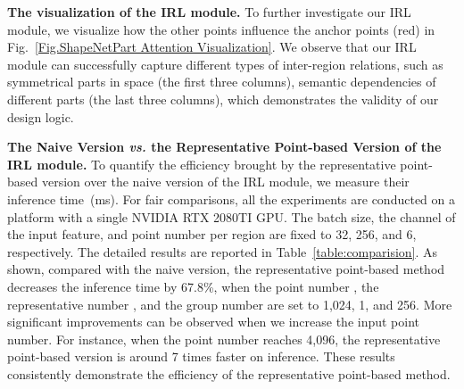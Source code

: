 \documentclass[journal]{IEEEtran}
\begin{document}
\noindent\textbf{The visualization of the IRL module.} To further investigate our IRL module, we visualize how the other points influence the anchor points (red) in Fig.~\ref{Fig.ShapeNetPart Attention Visualization}. We observe that our IRL module can successfully capture different types of inter-region relations, such as symmetrical parts in space (the first three columns), semantic dependencies of different parts (the last three columns), which demonstrates the validity of our design logic.

\noindent\textbf{The Naive Version \emph{vs.} the Representative Point-based Version of the IRL module.}\label{complexity_comp}
To quantify the efficiency brought by the representative point-based version over the naive version of the IRL module, we measure their inference time~(ms). For fair comparisons, all the experiments are conducted on a platform with a single NVIDIA RTX 2080TI GPU. The batch size, the channel of the input feature, and point number  per region are fixed to 32, 256, and 6, respectively. The detailed results are reported in Table~\ref{table:comparision}. As shown, compared with the naive version, the representative point-based method decreases the inference time by 67.8\%, when the point number , the representative number , and the group number  are set to 1,024, 1, and 256. More significant improvements can be observed when we increase the input point number. For instance, when the point number reaches 4,096, the representative point-based version is around 7 times faster on inference. These results consistently demonstrate the efficiency of the representative point-based method. 
\end{document}
